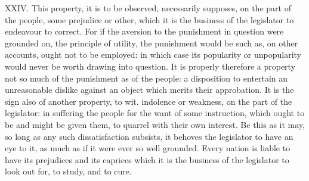 \documentclass[12pt]{report}
\begin{document}
XXIV. This property, it is to be observed, necessarily supposes, on the
part of the people, some prejudice or other, which it is the business of
the legislator to endeavour to correct. For if the aversion to the
punishment in question were grounded on, the principle of utility, the
punishment would be such as, on other accounts, ought not to be
employed: in which case its popularity or unpopularity would never be
worth drawing into question. It is properly therefore a property not so
much of the punishment as of the people: a disposition to entertain an
unreasonable dislike against an object which merits their approbation.
It is the sign also of another property, to wit. indolence or weakness,
on the part of the legislator: in suffering the people for the want of
some instruction, which ought to be and might be given them, to quarrel
with their own interest. Be this as it may, so long as any such
dissatisfaction subsists, it behoves the legislator to have an eye to
it, as much as if it were ever so well grounded. Every nation is liable
to have its prejudices and its caprices which it is the business of the
legislator to look out for, to study, and to cure.
\end{document}

